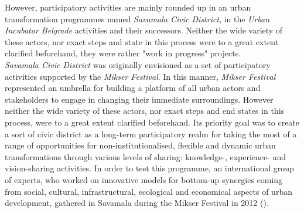 \documentclass[11pt]{report}
\begin{document}
However, participatory activities are mainly rounded up in an urban transformation programmes named \textit{Savamala Civic District}, in the \textit{Urban Incubator Belgrade} activities and their successors. Neither the wide variety of these actors, nor exact steps and state in this process were to a great extent clarified beforehand, they were rather "work in progress" projects.
\\
\textit{Savamala Civic District} was originally envisioned as a set of participatory activities supported by the \textit{Mikser Festival}. In this manner, \textit{Mikser Festival} represented an umbrella for building a platform of all urban actors and stakeholders to engage in changing their immediate surroundings. However neither the wide variety of these actors, nor exact steps and end states in this process, were to a great extent clarified beforehand.
Its priority goal was to create a sort of civic district as a long-term participatory realm for taking the most of a range of opportunities for non-institutionalised, flexible and dynamic urban transformations through various levels of sharing: knowledge-, experience- and vision-sharing activities. In order to test this programme, an international group of experts, who worked on innovative models for bottom-up synergies coming from social, cultural, infrastructural, ecological and economical aspects of urban development, gathered in Savamala during the Mikser Festival in 2012 (\cite{Cvetinovic et al 2013}).
\end{document}
